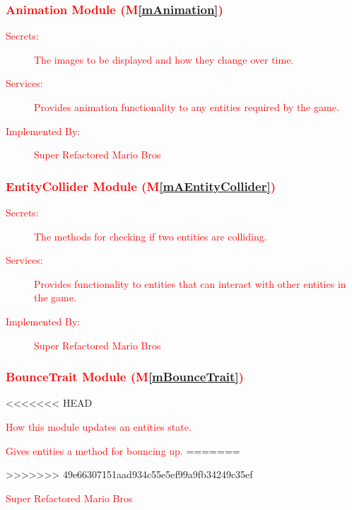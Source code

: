 \documentclass[12pt, titlepage]{article}
\newcommand{\mref}[1]{M\ref{#1}}
\begin{document}
\subsubsection{\textcolor{red}{Animation Module (\mref{mAnimation})}}

\begin{description}
\item[\textcolor{red}{Secrets:}] \textcolor{red}{The images to be displayed and how they change over time.}
\item[\textcolor{red}{Services:}] \textcolor{red}{Provides animation functionality to any entities required by the game.}
\item[\textcolor{red}{Implemented By:}] \textcolor{red}{Super Refactored Mario Bros}
\end{description}

\subsubsection{\textcolor{red}{EntityCollider Module (\mref{mAEntityCollider})}}

\begin{description}
\item[\textcolor{red}{Secrets:}] \textcolor{red}{The methods for checking if two entities are colliding.}
\item[\textcolor{red}{Services:}] \textcolor{red}{Provides functionality to entities that can interact with other entities in the game.}
\item[\textcolor{red}{Implemented By:}] \textcolor{red}{Super Refactored Mario Bros}
\end{description}

\subsubsection{\textcolor{red}{BounceTrait Module (\mref{mBounceTrait})}}

\begin{description}
<<<<<<< HEAD
\item[\textcolor{red}{Secrets:}] \textcolor{red}{How this module updates an entities state.}
\item[\textcolor{red}{Services:}] \textcolor{red}{Gives entities a method for bouncing up.}
=======
\item[\textcolor{red}{Secrets:}] \textcolor{red}{}
\item[\textcolor{red}{Services:}] \textcolor{red}{}
>>>>>>> 49e66307151aad934c55e5ef99a9fb34249c35ef
\item[\textcolor{red}{Implemented By:}] \textcolor{red}{Super Refactored Mario Bros}
\end{description}
\end{document}

